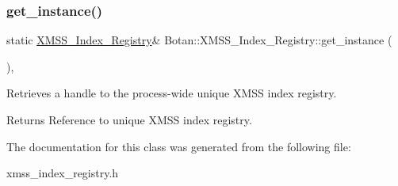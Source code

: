 \subsubsection{\texorpdfstring{get\+\_\+instance()}{get\_instance()}}
{\footnotesize\ttfamily static \hyperlink{class_botan_1_1_x_m_s_s___index___registry}{X\+M\+S\+S\+\_\+\+Index\+\_\+\+Registry}\& Botan\+::\+X\+M\+S\+S\+\_\+\+Index\+\_\+\+Registry\+::get\+\_\+instance (\begin{DoxyParamCaption}{ }\end{DoxyParamCaption})\hspace{0.3cm}{\ttfamily [inline]}, {\ttfamily [static]}}

Retrieves a handle to the process-\/wide unique X\+M\+SS index registry.

\begin{DoxyReturn}{Returns}
Reference to unique X\+M\+SS index registry. 
\end{DoxyReturn}


The documentation for this class was generated from the following file\+:\begin{DoxyCompactItemize}
\item 
xmss\+\_\+index\+\_\+registry.\+h\end{DoxyCompactItemize}

